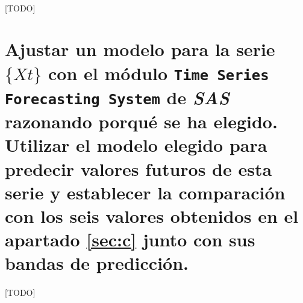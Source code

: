 \documentclass[a4paper, spanish]{article}
\begin{document}
    \paragraph{}
    [TODO]

  \section{Ajustar un modelo para la serie $\{ Xt \}$ con el módulo \texttt{Time Series Forecasting System} de \emph{SAS} razonando porqué se ha elegido. Utilizar el modelo elegido para predecir valores futuros de esta serie y establecer la comparación con los seis valores obtenidos en el apartado \ref{sec:c} junto con sus bandas de predicción.}
  \label{sec:f}

    \paragraph{}
    [TODO]
\end{document}
